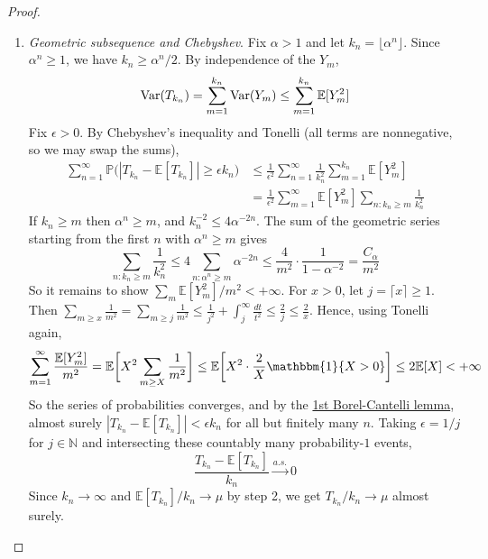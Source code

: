 \begin{proof}
\begin{enumerate}
			 \item \textit{Geometric subsequence and Chebyshev}. Fix $\alpha > 1$ and let $k_n = \lfloor \alpha^n \rfloor$. Since $\alpha^n \geq 1$, we have $k_n \geq \alpha^n / 2$. By independence of the $Y_m$,
			 \begin{equation}
				 \operatorname{Var}(T_{k_n}) = \sum_{m=1}^{k_n} \operatorname{Var}(Y_m) \leq \sum_{m=1}^{k_n} \mathbb{E}[Y_m^2]
			 \end{equation}
			 Fix $\epsilon > 0$. By Chebyshev's inequality and Tonelli (all terms are nonnegative, so we may swap the sums),
			 \begin{align}
				 \sum_{n=1}^\infty \mathbb{P}\big(|T_{k_n} - \mathbb{E}[T_{k_n}]| \geq \epsilon k_n\big)
					 & \leq \frac{1}{\epsilon^2} \sum_{n=1}^\infty \frac{1}{k_n^2} \sum_{m=1}^{k_n} \mathbb{E}[Y_m^2] \\
					 & = \frac{1}{\epsilon^2} \sum_{m=1}^\infty \mathbb{E}[Y_m^2] \sum_{n \colon k_n \geq m} \frac{1}{k_n^2}
			 \end{align}
			 If $k_n \geq m$ then $\alpha^n \geq m$, and $k_n^{-2} \leq 4 \alpha^{-2n}$. The sum of the geometric series starting from the first $n$ with $\alpha^n \geq m$ gives
			 \begin{equation}
				 \sum_{n \colon k_n \geq m} \frac{1}{k_n^2} \leq 4 \sum_{n \colon \alpha^n \geq m} \alpha^{-2n} \leq \frac{4}{m^2} \cdot \frac{1}{1 - \alpha^{-2}} = \frac{C_\alpha}{m^2}
			 \end{equation}
			 So it remains to show $\sum_{m} \mathbb{E}[Y_m^2]/m^2 < +\infty$. For $x > 0$, let $j = \lceil x \rceil \geq 1$. Then $\sum_{m \geq x} \frac{1}{m^2} = \sum_{m \geq j} \frac{1}{m^2} \leq \frac{1}{j^2} + \int_j^\infty \frac{dt}{t^2} \leq \frac{2}{j} \leq \frac{2}{x}$. Hence, using Tonelli again,
			 \begin{equation}
				 \sum_{m=1}^\infty \frac{\mathbb{E}[Y_m^2]}{m^2} = \mathbb{E}\bigg[ X^2 \sum_{m \geq X} \frac{1}{m^2} \bigg] \leq \mathbb{E}\bigg[ X^2 \cdot \frac{2}{X} \mathbbm{1}\{X > 0\} \bigg] \leq 2 \mathbb{E}[X] < +\infty
			 \end{equation}
			 So the series of probabilities converges, and by the \hyperref[thm:1st-borel-cantelli-lemma]{1st Borel-Cantelli lemma}, almost surely $|T_{k_n} - \mathbb{E}[T_{k_n}]| < \epsilon k_n$ for all but finitely many $n$. Taking $\epsilon = 1/j$ for $j \in \mathbb{N}$ and intersecting these countably many probability-$1$ events,
			 \begin{equation}
				 \frac{T_{k_n} - \mathbb{E}[T_{k_n}]}{k_n} \xrightarrow{a.s.} 0
			 \end{equation}
			 Since $k_n \to \infty$ and $\mathbb{E}[T_{k_n}]/k_n \to \mu$ by step 2, we get $T_{k_n}/k_n \to \mu$ almost surely.


\end{enumerate}
\end{proof}
